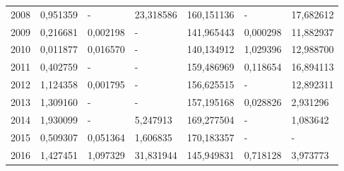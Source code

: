 \begin{table}
\begin{tabular}{p{1cm}p{2cm}p{2cm}p{2cm}p{2cm}p{2cm}p{2cm}}
 2008 &                          0,951359 &                                           - &                           23,318586 &                     160,151136 &                          - &                           17,682612 \\
 2009 &                          0,216681 &                                    0,002198 &                                   - &                     141,965443 &                   0,000298 &                           11,882937 \\
 2010 &                          0,011877 &                                    0,016570 &                                   - &                     140,134912 &                   1,029396 &                           12,988700 \\
 2011 &                          0,402759 &                                           - &                                   - &                     159,486969 &                   0,118654 &                           16,894113 \\
 2012 &                          1,124358 &                                    0,001795 &                                   - &                     156,625515 &                          - &                           12,892311 \\
 2013 &                          1,309160 &                                           - &                                   - &                     157,195168 &                   0,028826 &                            2,931296 \\
 2014 &                          1,930099 &                                           - &                            5,247913 &                     169,277504 &                          - &                            1,083642 \\
 2015 &                          0,509307 &                                    0,051364 &                            1,606835 &                     170,183357 &                          - &                                   - \\
 2016 &                          1,427451 &                                    1,097329 &                           31,831944 &                     145,949831 &                   0,718128 &                            3,973773 \\
\bottomrule
\end{tabular}
\end{table}
